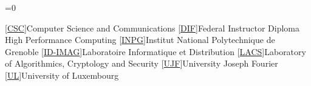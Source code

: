 \documentclass{cv}
\begin{document}
\ifnum\pdfstrcmp{\cvtype}{\cvtiny}=0
\else










%

\clearpage
\fi








\begin{acronym}
    [\href{http://csc.uni.lu}{CSC}]{Computer Science and Communications}
    [\href{http://www.ffkama.fr/direction-technique/formation/formationsfederales.php}{DIF}]{Federal Instructor Diploma}
     {High Performance Computing}
    [\href{http://www.grenoble-inp.fr/}{INPG}]{Institut National Polytechnique de Grenoble}
    [\href{http://www-id.imag.fr}{ID-IMAG}]{Laboratoire Informatique et Distribution}
    [\href{http://lacs.uni.lu}{LACS}]{Laboratory of Algorithmics, Cryptology and Security}
    [\href{http://www.ujf-grenoble.fr/}{UJF}]{University Joseph Fourier}
    [\href{http://www.uni.lu}{UL}]{University of Luxembourg}
\end{acronym}
\end{document}
